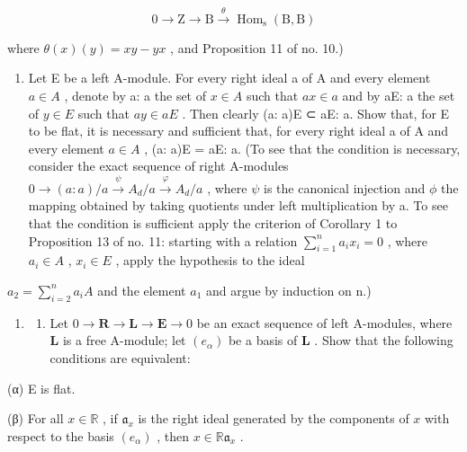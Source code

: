 \[
0 \longrightarrow \mathrm{Z} \longrightarrow \mathrm{B} \stackrel {\theta} {\longrightarrow} \operatorname{Hom} _ {\mathrm{s}} (\mathrm{B}, \mathrm{B})
\]

where \(\theta (x)(y) = xy - yx\) , and Proposition 11 of no. 10.)

\begin{enumerate}
\def\labelenumi{\arabic{enumi}.}
\setcounter{enumi}{21}
\tightlist
\item
  Let E be a left A-module. For every right ideal a of A and every element \(a \in A\) , denote by a: a the set of \(x \in A\) such that \(ax \in a\) and by aE: a the set of \(y \in E\) such that \(ay \in aE\) . Then clearly (a: a)E ⊂ aE: a. Show that, for E to be flat, it is necessary and sufficient that, for every right ideal a of A and every element \(a \in A\) , (a: a)E = aE: a. (To see that the condition is necessary, consider the exact sequence of right A-modules \(0 \to (a: a)/a \stackrel{\psi}{\to} A_d/a \stackrel{\varphi}{\to} A_d/a\) , where \(\psi\) is the canonical injection and \(\phi\) the mapping obtained by taking quotients under left multiplication by a. To see that the condition is sufficient apply the criterion of Corollary 1 to Proposition 13 of no. 11: starting with a relation \(\sum_{i=1}^{n} a_i x_i = 0\) , where \(a_i \in A\) , \(x_i \in E\) , apply the hypothesis to the ideal
\end{enumerate}

\(a_{2}=\sum_{i=2}^{n}a_{i}A\) and the element \(a_{1}\) and argue by induction on n.)

\begin{enumerate}
\def\labelenumi{\arabic{enumi}.}
\setcounter{enumi}{22}
\tightlist
\item
  \begin{enumerate}
  \def\labelenumii{(\alph{enumii})}
  \tightlist
  \item
    Let \(0 \to \mathbf{R} \to \mathbf{L} \to \mathbf{E} \to 0\) be an exact sequence of left A-modules, where \(\mathbf{L}\) is a free A-module; let \((e_{\alpha})\) be a basis of \(\mathbf{L}\) . Show that the following conditions are equivalent:
  \end{enumerate}
\end{enumerate}

(α) E is flat.

(β) For all \(x \in \mathbb{R}\) , if \(\mathfrak{a}_x\) is the right ideal generated by the components of \(x\) with respect to the basis \((e_{\alpha})\) , then \(x \in \mathbb{R}\mathfrak{a}_x\) .

